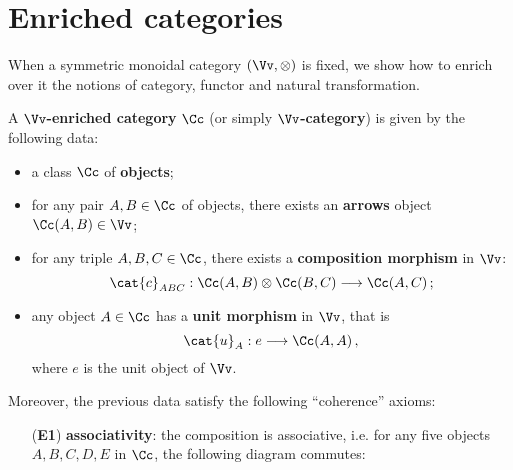 
\section{Enriched categories}

When a symmetric monoidal category $(\Vv, \otimes)$ is fixed, 
we show how to enrich over it the notions of category, 
functor and natural transformation.

\begin{df}
    A \textbf{$\Vv$-enriched category} $\Cc$
    (or simply \textbf{$\Vv$-category})
    is given by the following data:
    \begin{itemize}
        \item a class $\Cc$ of \textbf{objects};

        \item for any pair $A,B \in \Cc$ of objects,
        there exists an \textbf{arrows} object $\Cc(A,B) \in \Vv$;

        \item for any triple $A,B,C \in \Cc$,
        there exists a \textbf{composition morphism} in $\Vv$:
            \begin{equation*}
                \cat{c}_{ABC} : \Cc(A,B) \otimes \Cc(B,C) \longrightarrow \Cc(A,C)\,;
            \end{equation*}

        \item any object $A \in \Cc$ has a \textbf{unit morphism}
        in $\Vv$, that is
            \begin{equation*}
                \cat{u}_{A} : e \longrightarrow \Cc(A,A)\,,
            \end{equation*}
        where $e$ is the unit object of $\Vv$.
    \end{itemize}
    Moreover, the previous data satisfy the following
    ``coherence'' axioms:
    \begin{itemize}
        \item[(\textbf{E1})]\label{E1} \textbf{associativity}:
        the composition is associative, i.e. 
        for any five objects $A,B,C,D,E$ in $\Cc$,
        the following diagram commutes:
        \begin{center}
        \end{center}


\end{itemize}
\end{df}
